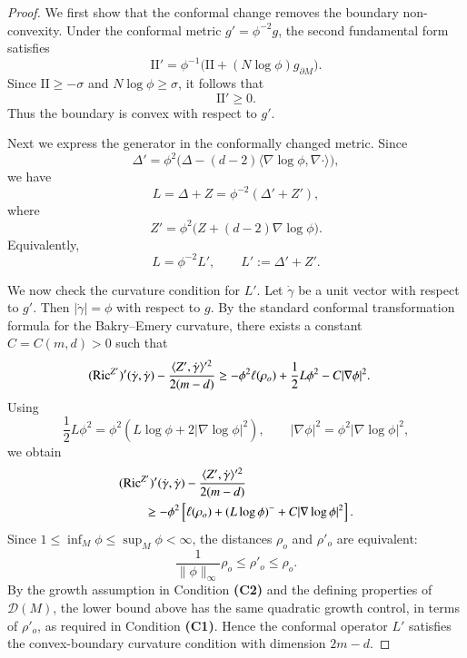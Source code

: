 \documentclass[11pt,twoside, reqno]{article}
\def\mathpal#1{\mathop{\mathchoice{\text{\rm #1}}%
   {\text{\rm #1}}{\text{\rm #1}}%
   {\text{\rm #1}}}\nolimits}
\newcommand\Ric{\mathpal{Ric}}
\newcommand\1{\mathbbm{1}}
\newcommand\II{\mathrm{II}}
\theoremstyle{definition}
\numberwithin{equation}{section}
\begin{document}
\begin{proof}
We first show that the conformal change removes the boundary
non-convexity. Under the conformal metric \(g'=\phi^{-2}g\), the second
fundamental form satisfies
\[
        \II'
        =
        \phi^{-1}\bigl(\II+(N\log\phi)g_{\partial M}\bigr).
\]
Since \(\II\geq-\sigma\) and \(N\log\phi\geq\sigma\), it follows that
\[
        \II'\geq0.
\]
Thus the boundary is convex with respect to \(g'\).

Next we express the generator in the conformally changed metric. Since
\[
        \Delta'
        =
        \phi^2\bigl(\Delta-(d-2)\langle\nabla\log\phi,\nabla\cdot\rangle\bigr),
\]
we have
\[
        L=\Delta+Z
        =
        \phi^{-2}(\Delta'+Z'),
\]
where
\[
        Z'=\phi^2\bigl(Z+(d-2)\nabla\log\phi\bigr).
\]
Equivalently,
\[
        L=\phi^{-2}L',
        \qquad
        L':=\Delta'+Z'.
\]

We now check the curvature condition for \(L'\). Let \(\dot\gamma\) be a
unit vector with respect to \(g'\). Then \(|\dot\gamma|=\phi\) with respect
to \(g\). By the standard conformal transformation formula for the
Bakry--Emery curvature, there exists a constant \(C=C(m,d)>0\) such that
\[
\begin{aligned}
&(\Ric^{Z'})'(\dot\gamma,\dot\gamma)
-
\frac{\langle Z',\dot\gamma\rangle'^2}{2(m-d)}
\geq
-\phi^2\ell(\rho_o)
+
\frac12 L\phi^2
-
C|\nabla\phi|^2 .
\end{aligned}
\]
Using
\[
        \frac12L\phi^2
        =
        \phi^2\left(L\log\phi+2|\nabla\log\phi|^2\right),
        \qquad
        |\nabla\phi|^2=\phi^2|\nabla\log\phi|^2,
\]
we obtain
\[
\begin{aligned}
&(\Ric^{Z'})'(\dot\gamma,\dot\gamma)
-
\frac{\langle Z',\dot\gamma\rangle'^2}{2(m-d)}
\\
&\qquad\geq
-\phi^2
\left[
        \ell(\rho_o)
        +(L\log\phi)^-
        +C|\nabla\log\phi|^2
\right].
\end{aligned}
\]
Since \(1\leq \inf_M\phi\leq\sup_M\phi<\infty\), the distances \(\rho_o\) and
\(\rho'_o\) are equivalent:
\[
        \frac{1}{\|\phi\|_\infty}\rho_o
        \leq
        \rho'_o
        \leq
        \rho_o .
\]
By the growth assumption in Condition {\bf(C2)} and the defining properties
of \(\mathcal D(M)\), the lower bound above has the same quadratic growth
control, in terms of \(\rho'_o\), as required in Condition {\bf(C1)}. Hence
the conformal operator \(L'\) satisfies the convex-boundary curvature
condition with dimension \(2m-d\).


\end{proof}
\end{document}
